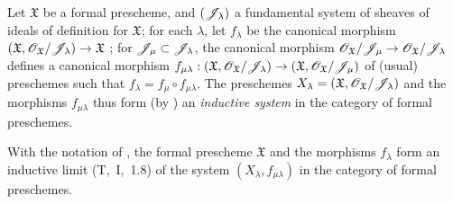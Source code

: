 \begin{env}[10.6.1]
\label{I.10.6.1}
Let $\mathfrak{X}$ be a formal prescheme, and $(\mathscr{J}_\lambda)$ a fundamental system of sheaves of ideals of definition for $\mathfrak{X}$; for each $\lambda$, let $f_\lambda$ be the canonical morphism $(\mathfrak{X},\sh{O}_\mathfrak{X}/\sh{J}_\lambda)\to\mathfrak{X}$ ; for $\mathscr{J}_\mu\subset\mathscr{J}_\lambda$, the canonical morphism $\sh{O}_\mathfrak{X}/\sh{J}_\mu\to\sh{O}_\mathfrak{X}/\sh{J}_\lambda$ defines a canonical morphism
$f_{\mu\lambda}:(\mathfrak{X},\sh{O}_\mathfrak{X}/\sh{J}_\lambda)\to(\mathfrak{X},\sh{O}_\mathfrak{X}/\sh{J}_\mu)$ of (usual) preschemes such that $f_\lambda=f_\mu\circ f_{\mu\lambda}$.
The preschemes $X_\lambda=(\mathfrak{X},\mathscr{O}_\mathfrak{X}/\mathscr{J}_\lambda)$ and the morphisms $f_{\mu\lambda}$ thus form (by ) an \emph{inductive system} in the category of formal preschemes.
\end{env}

\begin{proposition}[10.6.2]
\label{I.10.6.2}
With the notation of , the formal prescheme $\mathfrak{X}$ and the morphisms $f_\lambda$ form an inductive limit (T,~I,~1.8) of the system $(X_\lambda,f_{\mu\lambda})$ in the category of formal preschemes.
\end{proposition}

